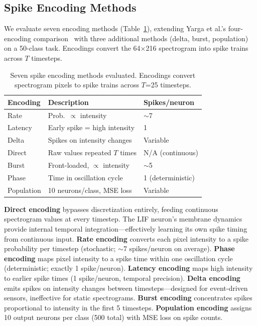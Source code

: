\documentclass[sigconf,nonacm=false]{acmart}
\begin{document}
\subsection{Spike Encoding Methods}

We evaluate seven encoding methods (Table~\ref{tab:encodings}), extending Yarga et al.'s four-encoding comparison~\cite{yarga2022} with three additional methods (delta, burst, population) on a 50-class task.
Encodings convert the 64$\times$216 spectrogram into spike trains across $T$ timesteps.

\begin{table}[t]
\caption{Seven spike encoding methods evaluated. Encodings convert spectrogram pixels to spike trains across $T$=25 timesteps.}
\label{tab:encodings}
\small
\begin{tabular}{@{}lll@{}}
\toprule
Encoding & Description & Spikes/neuron \\
\midrule
Rate & Prob.\ $\propto$ intensity & $\sim$7 \\
Latency & Early spike = high intensity & 1 \\
Delta & Spikes on intensity changes & Variable \\
Direct & Raw values repeated $T$ times & N/A (continuous) \\
Burst & Front-loaded, $\propto$ intensity & $\sim$5 \\
Phase & Time in oscillation cycle & 1 (deterministic) \\
Population & 10 neurons/class, MSE loss & Variable \\
\bottomrule
\end{tabular}
\end{table}

\textbf{Direct encoding} bypasses discretization entirely, feeding continuous spectrogram values at every timestep.
The LIF neuron's membrane dynamics provide internal temporal integration---effectively learning its own spike timing from continuous input.
\textbf{Rate encoding} converts each pixel intensity to a spike probability per timestep (stochastic; $\sim$7 spikes/neuron on average).
\textbf{Phase encoding} maps pixel intensity to a spike time within one oscillation cycle (deterministic; exactly 1 spike/neuron).
\textbf{Latency encoding} maps high intensity to earlier spike times (1 spike/neuron, temporal precision).
\textbf{Delta encoding} emits spikes on intensity changes between timesteps---designed for event-driven sensors, ineffective for static spectrograms.
\textbf{Burst encoding} concentrates spikes proportional to intensity in the first 5 timesteps.
\textbf{Population encoding} assigns 10 output neurons per class (500 total) with MSE loss on spike counts.
\end{document}
